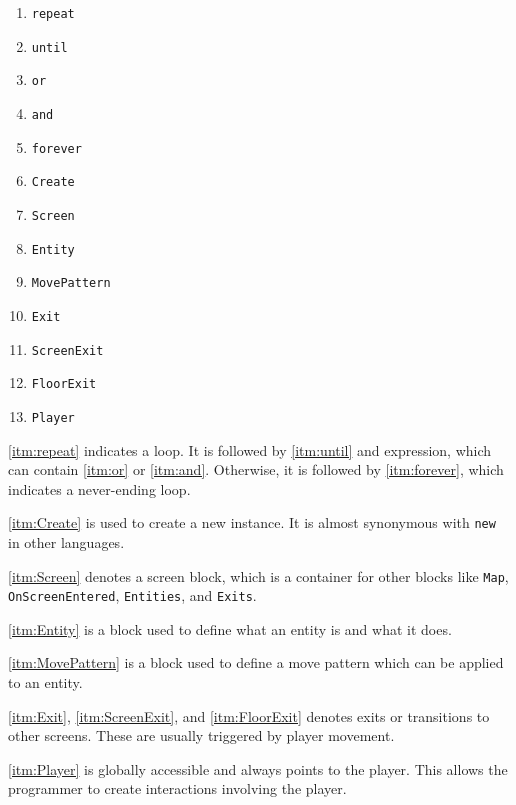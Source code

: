 \begin{multicols}{4}
    \begin{enumerate}
        \item \texttt{repeat}\label{itm:repeat}
        \item \texttt{until}\label{itm:until}
        \item \texttt{or}\label{itm:or}
        \item \texttt{and}\label{itm:and}
        \item \texttt{forever}\label{itm:forever}
        \item \texttt{Create}\label{itm:Create}
        \item \texttt{Screen}\label{itm:Screen}
        \item \texttt{Entity}\label{itm:Entity}
        \item \texttt{MovePattern}\label{itm:MovePattern}
        \item \texttt{Exit}\label{itm:Exit}
        \item \texttt{ScreenExit}\label{itm:ScreenExit}
        \item \texttt{FloorExit}\label{itm:FloorExit}
        \item \texttt{Player}\label{itm:Player}
    \end{enumerate}
\end{multicols}

\ref{itm:repeat} indicates a loop. It is followed by \ref{itm:until} and expression, which can contain \ref{itm:or} or \ref{itm:and}. Otherwise, it is followed by \ref{itm:forever}, which indicates a never-ending loop.

\ref{itm:Create} is used to create a new instance. It is almost synonymous with \verb|new| in other languages.

\ref{itm:Screen} denotes a screen block, which is a container for other blocks like \verb|Map|, \verb|OnScreenEntered|, \verb|Entities|, and \verb|Exits|.

\ref{itm:Entity} is a block used to define what an entity is and what it does.

\ref{itm:MovePattern} is a block used to define a move pattern which can be applied to an entity.

\ref{itm:Exit}, \ref{itm:ScreenExit}, and \ref{itm:FloorExit} denotes exits or transitions to other screens. These are usually triggered by player movement.

\ref{itm:Player} is globally accessible and always points to the player. This allows the programmer to create interactions involving the player. 
    
